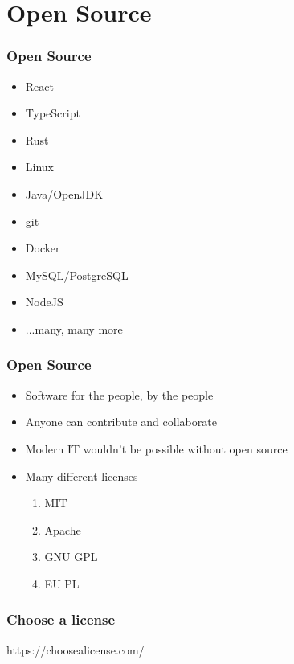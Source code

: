 \documentclass[presentation]{beamer}
\begin{document}
  \section{Open Source}
  \begin{frame}
    \frametitle{Open Source}
    \begin{itemize}
      \item React
      \item TypeScript
      \item Rust
      \item Linux
      \item Java/OpenJDK
      \item git
      \item Docker
      \item MySQL/PostgreSQL
      \item NodeJS
      \item ...many, many more
    \end{itemize}
  \end{frame}
  \begin{frame}
    \frametitle{Open Source}
 
    \begin{itemize}
      \item Software for the people, by the people
      \item Anyone can contribute and collaborate
      \item Modern IT wouldn't be possible without open source
      \item Many different licenses
      \begin{enumerate}
        \item MIT
        \item Apache
        \item GNU GPL
        \item EU PL
      \end{enumerate}
    \end{itemize}
  \end{frame}

  \begin{frame}[standout]
    \frametitle{Choose a license}
    https://choosealicense.com/
  \end{frame}
\end{document}

